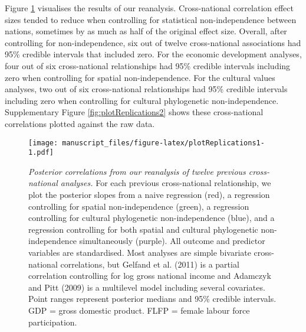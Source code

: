 \documentclass[english,man,floatsintext]{apa6}
\begin{document}
Figure \ref{fig:plotReplications1} visualises the results of our reanalysis. Cross-national correlation effect sizes tended to reduce when controlling for statistical non-independence between nations, sometimes by as much as half of the original effect size. Overall, after controlling for non-independence, six out of twelve cross-national associations had 95\% credible intervals that included zero. For the economic development analyses, four out of six cross-national relationships had 95\% credible intervals including zero when controlling for spatial non-independence. For the cultural values analyses, two out of six cross-national relationships had 95\% credible intervals including zero when controlling for cultural phylogenetic non-independence. Supplementary Figure \ref{fig:plotReplications2} shows these cross-national correlations plotted against the raw data.



\begin{figure}
\centering
\texttt{[image: manuscript\_files/figure-latex/plotReplications1-1.pdf]}
\caption{\label{fig:plotReplications1}\emph{Posterior correlations from our reanalysis of twelve previous cross-national analyses.} For each previous cross-national relationship, we plot the posterior slopes from a naive regression (red), a regression controlling for spatial non-independence (green), a regression controlling for cultural phylogenetic non-independence (blue), and a regression controlling for both spatial and cultural phylogenetic non-independence simultaneously (purple). All outcome and predictor variables are standardised. Most analyses are simple bivariate cross-national correlations, but Gelfand et al. (2011) is a partial correlation controlling for log gross national income and Adamczyk and Pitt (2009) is a multilevel model including several covariates. Point ranges represent posterior medians and 95\% credible intervals. GDP = gross domestic product. FLFP = female labour force participation.}
\end{figure}
\end{document}
